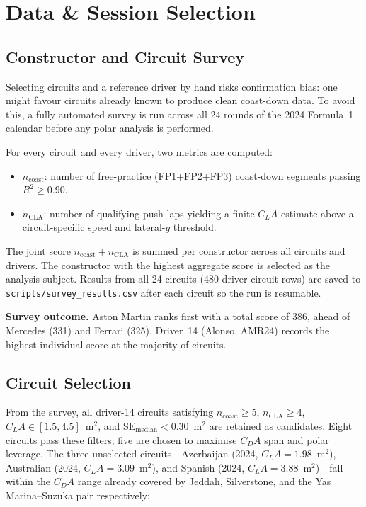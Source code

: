 \section{Data \& Session Selection}
\label{sec: Data & Session Selection}

\subsection{Constructor and Circuit Survey}
\label{sec: Constructor and Circuit Survey}

Selecting circuits and a reference driver by hand risks confirmation bias: one might favour circuits already known to produce clean coast-down data. To avoid this, a fully automated survey is run across all 24 rounds of the 2024 Formula~1 calendar before any polar analysis is performed.

For every circuit and every driver, two metrics are computed:
\begin{itemize}
    \item $n_\text{coast}$: number of free-practice (FP1+FP2+FP3) coast-down segments passing $R^2 \geq 0.90$.
    \item $n_\text{CLA}$: number of qualifying push laps yielding a finite $C_LA$ estimate above a circuit-specific speed and lateral-$g$ threshold.
\end{itemize}

The joint score $n_\text{coast} + n_\text{CLA}$ is summed per constructor across all circuits and drivers. The constructor with the highest aggregate score is selected as the analysis subject. Results from all 24 circuits (480 driver-circuit rows) are saved to \texttt{scripts/survey\_results.csv} after each circuit so the run is resumable.

\textbf{Survey outcome.} Aston Martin ranks first with a total score of 386, ahead of Mercedes (331) and Ferrari (325). Driver~14 (Alonso, AMR24) records the highest individual score at the majority of circuits.

\subsection{Circuit Selection}
\label{sec: Circuit Selection}

From the survey, all driver-14 circuits satisfying $n_\text{coast} \geq 5$, $n_\text{CLA} \geq 4$, $C_LA \in [1.5, 4.5]$~m$^2$, and $\text{SE}_\text{median} < 0.30$~m$^2$ are retained as candidates. Eight circuits pass these filters; five are chosen to maximise $C_DA$ span and polar leverage. The three unselected circuits---Azerbaijan (2024, $C_LA = 1.98$~m$^2$), Australian (2024, $C_LA = 3.09$~m$^2$), and Spanish (2024, $C_LA = 3.88$~m$^2$)---fall within the $C_DA$ range already covered by Jeddah, Silverstone, and the Yas Marina--Suzuka pair respectively:

